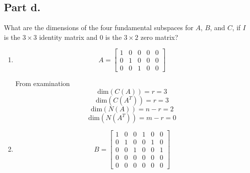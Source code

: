 \subsection{Part d.}
What are the dimensions of the four fundamental subspaces for $A$, $B$, and
$C$, if $I$ is the $3\times3$ identity matrix and $0$ is the $3\times2$
zero matrix?
\begin{enumerate}[label=(\alph*)]
    \item 
        \begin{equation}
            A = 
            \begin{bmatrix}
                1   &   0   &   0   &   0   &   0   \\
                0   &   1   &   0   &   0   &   0   \\
                0   &   0   &   1   &   0   &   0
            \end{bmatrix}
        \end{equation}
        \begin{mdframed}[style=MyFrame]
            From examination
                \begin{equation}
                    \text{dim}(C(A)) = r =3
                \end{equation}
                \begin{equation}
                    \text{dim}(C(A^{T})) = r = 3
                \end{equation}
                \begin{equation}
                    \text{dim}(N(A)) = n-r = 2 
                \end{equation}
                \begin{equation}
                    \text{dim}(N(A^{T})) = m-r = 0 
                \end{equation}
        \end{mdframed}
    \item 
        \begin{equation}
            B = 
            \begin{bmatrix}
                1   &   0   &   0   & 1 &   0   &   0  \\
                0   &   1   &   0   & 0 &   1   &   0  \\
                0   &   0   &   1   & 0 &   0   &   1  \\
                0   &   0   &   0   & 0 &   0   &   0  \\
                0   &   0   &   0   & 0 &   0   &   0
                

\end{bmatrix}
\end{equation}
\end{enumerate}
